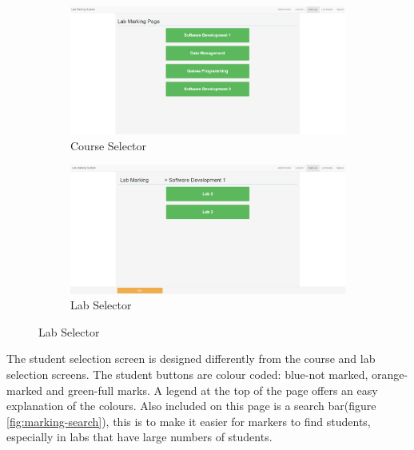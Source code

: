 \documentclass[11pt]{report}
\begin{document}
\begin{figure}[H]
\caption{Lab Marking Page}
\centering
\begin{subfigure}[c]{0.45\textwidth}
    \includegraphics[width=1\textwidth]{images/implementation/marking-1-page.png}
    \caption{Course Selector}
    \label{fig:marking-course}
\end{subfigure}
\hfill
\begin{subfigure}[c]{0.45\textwidth}
    \includegraphics[width=1\textwidth]{images/implementation/marking-2-page.png}
    \caption{Lab Selector}
    \label{fig:marking-lab}
\end{subfigure}

\end{figure}

\noindent The student selection screen is designed differently from the course and lab selection screens. The student buttons are colour coded: blue-not marked, orange-marked and green-full marks. A legend at the top of the page offers an easy explanation of the colours. Also included on this page is a search bar(figure \ref{fig:marking-search}), this is to make it easier for markers to find students, especially in labs that have large numbers of students.
\end{document}
